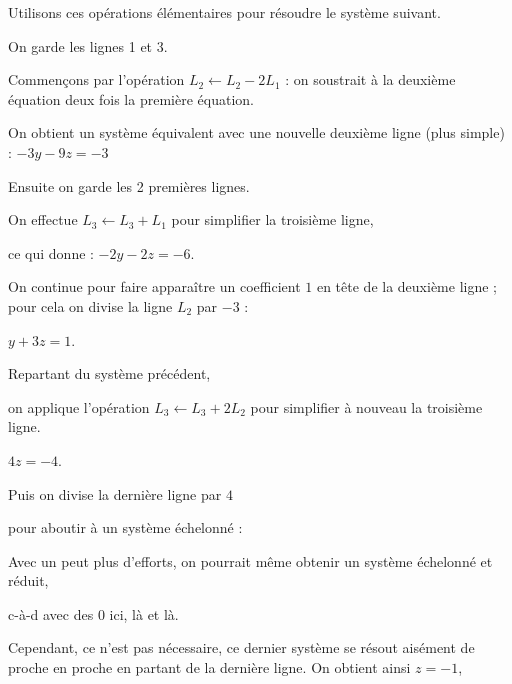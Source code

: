 Utilisons ces opérations élémentaires pour résoudre le système suivant.

\change

On garde les lignes 1 et 3.

\change

Commençons par l'opération $L_2 \leftarrow L_2 - 2L_1$ : 
on soustrait à la deuxième équation deux fois la première équation.

\change

On obtient un système équivalent avec une nouvelle deuxième ligne (plus simple) :
$-3y -9z  =  -3$

\change

Ensuite on garde les 2 premières lignes.

\change



On effectue $L_3 \leftarrow L_3 + L_1$  pour simplifier la troisième ligne, 

\change

ce qui donne : $-2y -2z  =  -6$.


\change

On continue pour faire apparaître un coefficient $1$ en tête de la deuxième ligne ;
pour cela on divise la ligne $L_2$ par $-3$ :

\change

$y   +3z  =  1$.


\diapo

Repartant du système précédent,

\change

\change


on applique l'opération $L_3 \leftarrow L_3 + 2L_2$  pour simplifier à nouveau la troisième ligne. 

\change

$4z  = -4$.

\change

\change

Puis on divise la dernière ligne par $4$ 

\change

pour aboutir à un système échelonné :


\change

Avec un peut plus d'efforts, on pourrait même obtenir un système échelonné et réduit,

c-à-d avec des $0$ ici, là et là.

Cependant, ce n'est pas nécessaire, ce dernier système se résout aisément 
de proche en proche en partant de la dernière ligne. On obtient ainsi $z=-1$,


